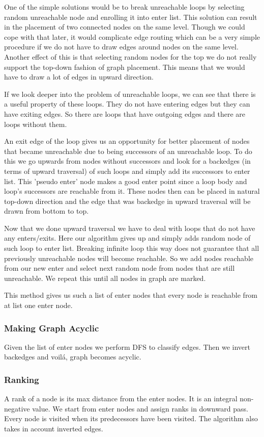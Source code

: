 \documentclass[11pt,a4paper]{article}
\begin{document}
One of the simple solutions would be to break unreachable loops by selecting random unreachable node and enrolling it into enter list. This solution can result in the placement of two connected nodes on the same level. Though we could cope with that later, it would complicate edge routing which can be a very simple procedure if we do not have to draw edges around nodes on the same level. Another effect of this is that selecting random nodes for the top we do not really support the top-down fashion of graph placement. This means that we would have to draw a lot of edges in upward direction.

If we look deeper into the problem of unreachable loops, we can see that there is a useful property of these loops. They do not have entering edges but they can have exiting edges. So there are loops that have outgoing edges and there are loops without them. 

An exit edge of the loop gives us an opportunity for better placement of nodes that became unreachable due to being successors of an unreachable loop. To do this we go upwards from nodes without successors and look for a backedges (in terms of upward traversal) of such loops and simply add its successors to enter list. This 'pseudo enter' node makes a good enter point since a loop body and loop's successors are reachable from it. These nodes then can be placed in natural top-down direction and the edge that was backedge in upward traversal will be drawn from bottom to top.

Now that we done upward traversal we have to deal with loops that do not have any enters/exits. Here our algorithm gives up and simply adds random node of such loop to enter list. Breaking infinite loop this way does not guarantee that all previously unreachable nodes will become reachable. So we add nodes reachable from our new enter and select next random node from nodes that are still unreachable. We repeat this until all nodes in graph are marked.

This method gives us such a list of enter nodes that every node is reachable from at list one enter node.

\subsubsection{Making Graph Acyclic}
Given the list of enter nodes we perform DFS to classify edges. Then we invert backedges and voil\'a, graph becomes acyclic.

\subsubsection{Ranking}
A rank of a node is its max distance from the enter nodes. It is an integral non-negative value. We start from enter nodes and assign ranks in downward pass. Every node is visited when its predecessors have been visited. The algorithm also takes in account inverted edges.
\end{document}
